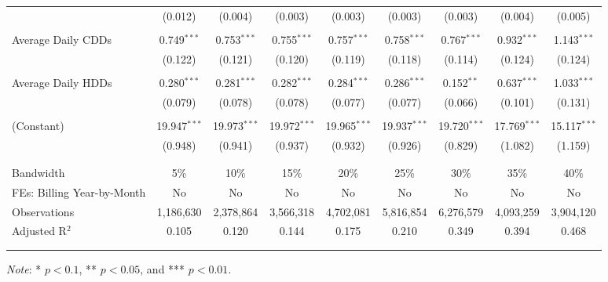 {\begin{table}[t!]
\begin{adjustbox}{scale = 0.85}
\begin{threeparttable}
\begin{tabular}{@{\extracolsep{5pt}}lcccccccc}
                    & (0.012) & (0.004) & (0.003) & (0.003) & (0.003) & (0.003) & (0.004) & (0.005) \\ 
                    & & & & & & & & \\ 
                    Average Daily CDDs & 0.749$^{***}$ & 0.753$^{***}$ & 0.755$^{***}$ & 0.757$^{***}$ & 0.758$^{***}$ & 0.767$^{***}$ & 0.932$^{***}$ & 1.143$^{***}$ \\ 
                    & (0.122) & (0.121) & (0.120) & (0.119) & (0.118) & (0.114) & (0.124) & (0.124) \\ 
                    & & & & & & & & \\ 
                    Average Daily HDDs & 0.280$^{***}$ & 0.281$^{***}$ & 0.282$^{***}$ & 0.284$^{***}$ & 0.286$^{***}$ & 0.152$^{**}$ & 0.637$^{***}$ & 1.033$^{***}$ \\ 
                    & (0.079) & (0.078) & (0.078) & (0.077) & (0.077) & (0.066) & (0.101) & (0.131) \\ 
                    & & & & & & & & \\ 
                    (Constant) & 19.947$^{***}$ & 19.973$^{***}$ & 19.972$^{***}$ & 19.965$^{***}$ & 19.937$^{***}$ & 19.720$^{***}$ & 17.769$^{***}$ & 15.117$^{***}$ \\ 
                    & (0.948) & (0.941) & (0.937) & (0.932) & (0.926) & (0.829) & (1.082) & (1.159) \\ 
                    & & & & & & & & \\
                    \hline
                    \\[-2.0ex]
                    Bandwidth & 5\% & 10\% & 15\% & 20\% & 25\% & 30\% & 35\% & 40\% \\ 
                    FEs: Billing Year-by-Month & No & No & No & No & No & No & No & No \\ 
                    Observations & 1,186,630 & 2,378,864 & 3,566,318 & 4,702,081 & 5,816,854 & 6,276,579 & 4,093,259 & 3,904,120 \\ 
                    Adjusted R$^{2}$ & 0.105 & 0.120 & 0.144 & 0.175 & 0.210 & 0.349 & 0.394 & 0.468 \\
                    \\[-2.0ex]
                    \hline \hline
                    \\[-4.5ex]
                \end{tabular}
                \begin{tablenotes}[flushleft]
                    \footnotesize
                    \item \textit{Note}: * $p < 0.1$, ** $p < 0.05$, and *** $p < 0.01$.
                \end{tablenotes}
            \end{threeparttable}
        \end{adjustbox}
    \end{table}
}

